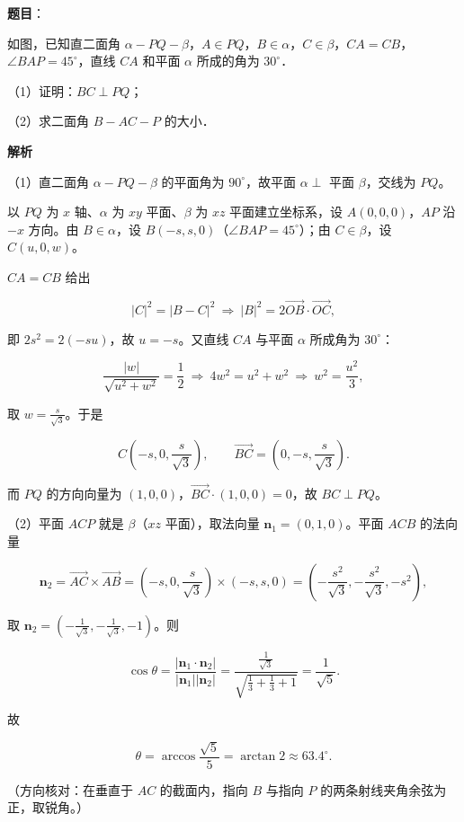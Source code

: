 \begin{answer}

\textbf{题目}：

如图，已知直二面角 $\alpha-PQ-\beta$，$A\in PQ$，$B\in\alpha$，$C\in\beta$，$CA=CB$，$\angle BAP=45^\circ$，直线 $CA$ 和平面 $\alpha$ 所成的角为 $30^\circ$．
\nopagebreak[4]
\begin{center}\end{center}
\nopagebreak[4]
（1）证明：$BC\perp PQ$；

（2）求二面角 $B-AC-P$ 的大小．

\textbf{解析}

（1）直二面角 $\alpha-PQ-\beta$ 的平面角为 $90^\circ$，故平面 $\alpha\perp$ 平面 $\beta$，交线为 $PQ$。

以 $PQ$ 为 $x$ 轴、$\alpha$ 为 $xy$ 平面、$\beta$ 为 $xz$ 平面建立坐标系，设 $A(0,0,0)$，$AP$ 沿 $-x$ 方向。由 $B\in\alpha$，设 $B(-s,s,0)$（$\angle BAP=45^\circ$）；由 $C\in\beta$，设 $C(u,0,w)$。

$CA=CB$ 给出

\nopagebreak[4]
\[|C|^2=|B-C|^2\ \Longrightarrow\ |B|^2=2\overrightarrow{OB}\cdot\overrightarrow{OC},\]

即 $2s^2=2(-su)$，故 $u=-s$。又直线 $CA$ 与平面 $\alpha$ 所成角为 $30^\circ$：

\nopagebreak[4]
\[\frac{|w|}{\sqrt{u^2+w^2}}=\frac12\ \Longrightarrow\ 4w^2=u^2+w^2\ \Longrightarrow\ w^2=\frac{u^2}{3},\]

取 $w=\frac{s}{\sqrt3}$。于是

\nopagebreak[4]
\[C\left(-s,0,\frac{s}{\sqrt3}\right),\qquad \overrightarrow{BC}=\left(0,-s,\frac{s}{\sqrt3}\right).\]

而 $PQ$ 的方向向量为 $(1,0,0)$，$\overrightarrow{BC}\cdot(1,0,0)=0$，故 $BC\perp PQ$。

（2）平面 $ACP$ 就是 $\beta$（$xz$ 平面），取法向量 $\mathbf n_1=(0,1,0)$。平面 $ACB$ 的法向量

\nopagebreak[4]
\[\mathbf n_2=\overrightarrow{AC}\times\overrightarrow{AB}
=\left(-s,0,\frac{s}{\sqrt3}\right)\times(-s,s,0)
=\left(-\frac{s^2}{\sqrt3},-\frac{s^2}{\sqrt3},-s^2\right),\]

取 $\mathbf n_2=\left(-\frac1{\sqrt3},-\frac1{\sqrt3},-1\right)$。则

\nopagebreak[4]
\[\cos\theta=\frac{|\mathbf n_1\cdot\mathbf n_2|}{|\mathbf n_1||\mathbf n_2|}
=\frac{\frac1{\sqrt3}}{\sqrt{\frac13+\frac13+1}}
=\frac{1}{\sqrt5}.\]

故

\nopagebreak[4]
\[\theta=\arccos\frac{\sqrt5}{5}=\arctan2\approx63.4^\circ .\]

（方向核对：在垂直于 $AC$ 的截面内，指向 $B$ 与指向 $P$ 的两条射线夹角余弦为正，取锐角。）


\end{answer}

